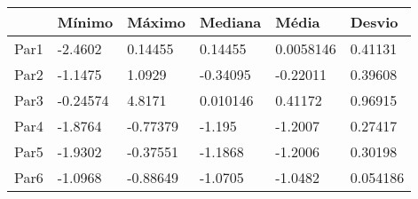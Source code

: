 \begin{tabular}{llllll}
& Mínimo & Máximo & Mediana & Média & Desvio \\ 
\hline 
Par1 & -2.4602 & 0.14455 & 0.14455 & 0.0058146 & 0.41131 \\ 
Par2 & -1.1475 & 1.0929 & -0.34095 & -0.22011 & 0.39608 \\ 
Par3 & -0.24574 & 4.8171 & 0.010146 & 0.41172 & 0.96915 \\ 
Par4 & -1.8764 & -0.77379 & -1.195 & -1.2007 & 0.27417 \\ 
Par5 & -1.9302 & -0.37551 & -1.1868 & -1.2006 & 0.30198 \\ 
Par6 & -1.0968 & -0.88649 & -1.0705 & -1.0482 & 0.054186 \\ 
\hline 
\end{tabular}
